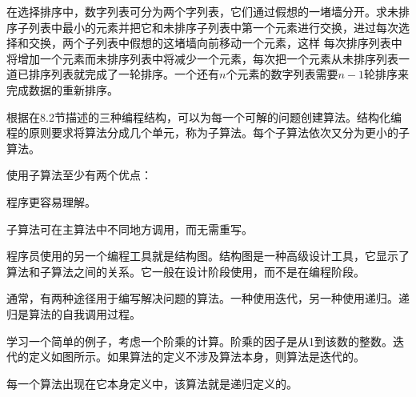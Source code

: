 在选择排序中，数字列表可分为两个字列表，它们通过假想的一堵墙分开。求未排序子列表中最小的元素并把它和未排序子列表中第一个元素进行交换，进过每次选择和交换，两个子列表中假想的这堵墙向前移动一个元素，这样 每次排序列表中将增加一个元素而未排序列表中将减少一个元素，每次把一个元素从未排序列表一道已排序列表就完成了一轮排序。一个还有$n$个元素的数字列表需要$n-1$轮排序来完成数据的重新排序。

根据在8.2节描述的三种编程结构，可以为每一个可解的问题创建算法。结构化编程的原则要求将算法分成几个单元，称为子算法。每个子算法依次又分为更小的子算法。

使用子算法至少有两个优点：

程序更容易理解。

子算法可在主算法中不同地方调用，而无需重写。

程序员使用的另一个编程工具就是结构图。结构图是一种高级设计工具，它显示了算法和子算法之间的关系。它一般在设计阶段使用，而不是在编程阶段。

通常，有两种途径用于编写解决问题的算法。一种使用迭代，另一种使用递归。递归是算法的自我调用过程。

学习一个简单的例子，考虑一个阶乘的计算。阶乘的因子是从1到该数的整数。迭代的定义如图所示。如果算法的定义不涉及算法本身，则算法是迭代的。

每一个算法出现在它本身定义中，该算法就是递归定义的。
